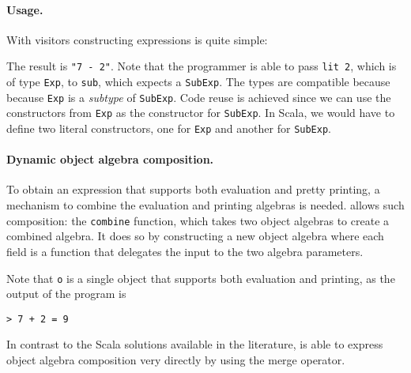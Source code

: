 \paragraph{Usage.} With visitors constructing expressions is quite simple:

\begin{comment}
  \begin{lstlisting}{language=F2J}
    e2 = sub (lit 7) (lit 2)
  \end{lstlisting}
\end{comment}
The result is \lstinline$"7 - 2"$. Note that the programmer is able to pass \lstinline{lit 2}, which is of type \lstinline{Exp},
to \lstinline{sub}, which expects a \lstinline{SubExp}. The types are compatible
because because \lstinline$Exp$ is a \emph{subtype} of \lstinline$SubExp$. Code
reuse is achieved since we can use the constructors from \lstinline$Exp$ as the
constructor for \lstinline$SubExp$. In Scala, we would have to define two
literal constructors, one for \lstinline$Exp$ and another for
\lstinline$SubExp$. 

\paragraph{Dynamic object algebra composition.}
To obtain an expression that supports both evaluation and pretty
printing, a mechanism to combine the evaluation and printing
algebras is needed. \name allows such composition: the \lstinline$combine$
function, which takes two object algebras to create a combined algebra. It
does so by constructing a new object algebra where each field is a
function that delegates the input to the two algebra parameters.
\begin{comment}
  \begin{lstlisting}{language=F2J}
    let combine[A,B](f: ExpAlg[A])(g: ExpAlg[B]) : 
    ExpAlg[A&B] = {
      lit = \(x: Int) -> f.lit x ,, g.lit x,
      add = \(x: A & B) (y: A & B) ->
      f.add x y ,, g.add x y
    }
  \end{lstlisting}
\end{comment}

\begin{comment}
  \begin{lstlisting}{language=F2J}
    let newAlg = 
    combine[IEval,IPrint] subEvalAlg printAlg;
    let o = e1[IEval&IPrint] newAlg;
    o.print ++ " = " ++ o.eval.toString()
  \end{lstlisting}
\end{comment}


Note that \lstinline$o$ is a single object that supports both
evaluation and printing, as the output of the program is
\begin{lstlisting}
> 7 + 2 = 9
\end{lstlisting}

In contrast to the Scala solutions available in the
literature, \name is able to express object algebra
composition very directly by using the merge operator. 